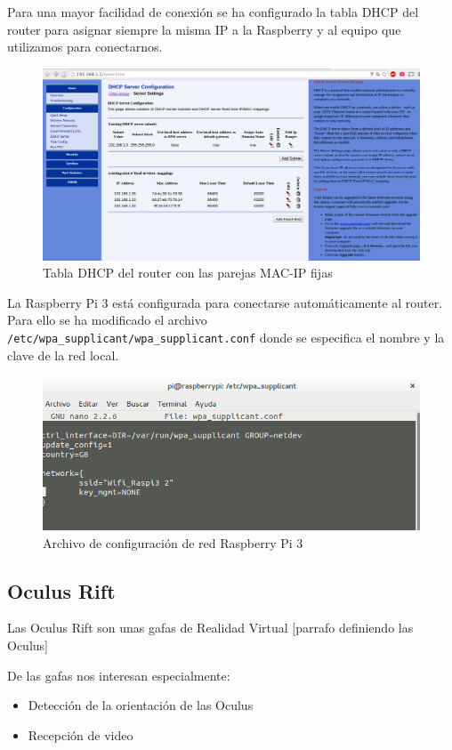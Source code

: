 \documentclass[twoside, 12pt]{epstfg}
\begin{document}
Para una mayor facilidad de conexión se ha configurado la tabla DHCP del router para asignar siempre la misma IP a la Raspberry y al equipo que utilizamos para conectarnos.

\begin{figure}[h]
	\centerline{
		\mbox{\includegraphics[width=.95\textwidth]{images/TablaDHCP2.png}}
	}
	\caption{Tabla DHCP del router con las parejas MAC-IP fijas}
\end{figure}

La Raspberry Pi 3 está configurada para conectarse automáticamente al router. Para ello se ha modificado el archivo \texttt{/etc/wpa\_supplicant/wpa\_supplicant.conf} donde se especifica el nombre y la clave de la red local.

\begin{figure}[h]
	\centerline{
		\mbox{\includegraphics[width=.95\textwidth]{images/confRaspiWifi.png}}
	}
	\caption{Archivo de configuración de red Raspberry Pi 3}
\end{figure}
 

\subsection{Oculus Rift}

Las Oculus Rift son unas gafas de Realidad Virtual [parrafo definiendo las Oculus]

De las gafas nos interesan especialmente:
\begin{itemize}
	\item Detección de la orientación de las Oculus
	\item Recepción de video
\end{itemize}
\end{document}
